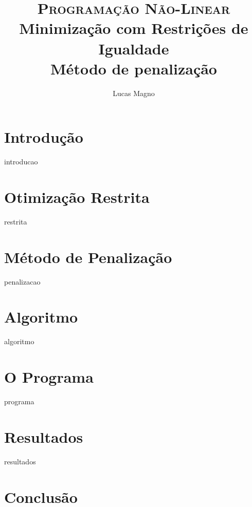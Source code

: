 \documentclass[paper=a4, fontsize=11pt]{scrartcl}	%
\title{
		\usefont{OT1}{bch}{b}{n}
		\normalfont \normalsize \textsc{Programação Não-Linear} \\ [25pt]
		\huge Minimização com Restrições de Igualdade \\
		\LARGE Método de penalização
}
\author{
		\normalfont 								\normalsize
        Lucas Magno\\[-3pt]		\normalsize
}
\date{}
\numberwithin{equation}{section}		%
\numberwithin{figure}{section}			%
\numberwithin{table}{section}			%
\numberwithin{definition}{section}
\numberwithin{theorem}{section}
\numberwithin{algorithm}{section}
\begin{document}
\maketitle

\section{Introdução}
	{introducao}

\section{Otimização Restrita}
	{restrita}

\section{Método de Penalização}
	{penalizacao}

\section{Algoritmo}
	{algoritmo}

\section{O Programa}
	{programa}

\section{Resultados}
	{resultados}

\section{Conclusão}


\end{document}
